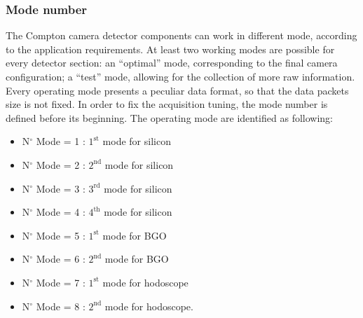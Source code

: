\begin{landscape}
\begin{figure} [!h]
  \label{fig::triggerGeneration}
\end{figure}
\end{landscape}


\subsubsection{Mode number\newline}

The Compton camera detector components can work in different mode, according to the application requirements. At least two working modes are possible for every detector section: an \enquote{optimal} mode, corresponding to the final camera configuration; a \enquote{test} mode, allowing for the collection of more raw information. Every operating mode presents a peculiar data format, so that the data packets size is not fixed. In order to fix the acquisition tuning, the mode number is defined before its beginning.\newline
The operating mode are identified as following: \newline
\begin{itemize}
	\item N$^{\circ}$ Mode = 1 : $1^{\mathrm{st}}$ mode for silicon
	\item N$^{\circ}$ Mode = 2 : $2^{\mathrm{nd}}$ mode for silicon
	\item N$^{\circ}$ Mode = 3 : $3^{\mathrm{rd}}$ mode for silicon
	\item N$^{\circ}$ Mode = 4 : $4^{\mathrm{th}}$ mode for silicon
	\item N$^{\circ}$ Mode = 5 : $1^{\mathrm{st}}$ mode for BGO
	\item N$^{\circ}$ Mode = 6 : $2^{\mathrm{nd}}$ mode for BGO
	\item N$^{\circ}$ Mode = 7 : $1^{\mathrm{st}}$ mode for hodoscope
	\item N$^{\circ}$ Mode = 8 : $2^{\mathrm{nd}}$ mode for hodoscope.\newline
\end{itemize}

